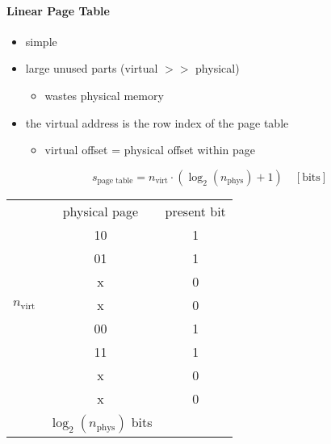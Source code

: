 \paragraph{Linear Page Table}
\begin{itemize}
    \item simple
    \item large unused parts (virtual $>>$ physical)
          \begin{itemize}
              \item wastes physical memory
          \end{itemize}
    \item the virtual address is the row index of the page table
          \begin{itemize}
              \item virtual offset = physical offset within page
          \end{itemize}
\end{itemize}

\noindent\begin{equation*}
    s_{\text{page table}} = n_{\text{virt}}\cdot (\log_2(n_{\text{phys}}) + 1)\quad [\text{bits}]
\end{equation*}

\renewcommand{\arraystretch}{1.3}
\setlength{\oldtabcolsep}{\tabcolsep}\setlength\tabcolsep{6pt}
\begin{tabularx}{\linewidth}{@{} c c c@{}}
                                                                                   & physical page                  & present bit \\
    \cmidrule{2-3}
    \multirow{7}{*}{\begin{sideways}$n_{\text{virt}}$\end{sideways}} & 10                             & 1           \\
                                                                                   & 01                             & 1           \\
                                                                                   & x                              & 0           \\
                                                                                   & x                              & 0           \\
                                                                                   & 00                             & 1           \\
                                                                                   & 11                             & 1           \\
                                                                                   & x                              & 0           \\
                                                                                   & x                              & 0           \\
    \cmidrule{2-3}
                                                                                   & $\log_2(n_{\text{phys}})$ bits &
\end{tabularx}


